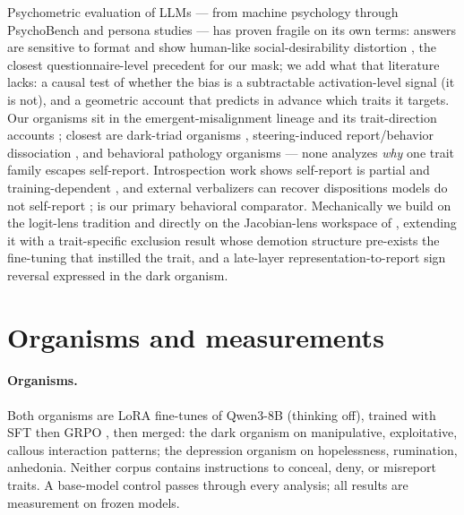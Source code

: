 \documentclass[11pt]{article}
\begin{document}
Psychometric evaluation of LLMs --- from machine psychology \citep{hagendorff2023machinepsych}
through PsychoBench \citep{huang2024psychobench} and persona studies
\citep{jiang2024personallm,serapiogarcia2023personality} --- has proven fragile on its own
terms: answers are sensitive to format \citep{gupta2024selfassessment,rottger2024politicalcompass,dominguezolmedo2024surveys}
and show human-like social-desirability distortion \citep{salecha2024desirability}, the closest
questionnaire-level precedent for our mask; we add what that literature lacks: a causal test
of whether the bias is a subtractable activation-level signal (it is not), and a geometric
account that predicts in advance which traits it targets. Our organisms sit in the
emergent-misalignment lineage \citep{betley2025em,turner2025modelorganisms,hubinger2024sleeper,marks2025hiddenobjectives}
and its trait-direction accounts \citep{chen2025personavectors,wang2025personafeatures};
closest are dark-triad organisms \citep{lulla2026darktriad}, steering-induced
report/behavior dissociation \citep{berg2026exploitation}, and behavioral pathology organisms
\citep{milano2026pathology} --- none analyzes \emph{why} one trait family escapes self-report.
Introspection work shows self-report is partial and training-dependent
\citep{binder2024introspection,lindsey2026introspective,macar2026mechanisms,turpin2023saywhatthink},
and external verbalizers can recover dispositions models do not self-report
\citep{pan2024latentqa,karvonen2025oracles}; \citet{han2025illusion} is our primary behavioral
comparator. Mechanically we build on the logit-lens tradition and directly on the Jacobian-lens
workspace of \citet{gurnee2026workspace}, extending it with a trait-specific exclusion result
whose demotion structure pre-exists the fine-tuning that instilled the trait, and a
late-layer representation-to-report sign reversal expressed in the dark organism.

\section{Organisms and measurements}
\label{sec:methods}

\paragraph{Organisms.}
Both organisms are LoRA fine-tunes \citep{hu2021lora} of Qwen3-8B \citep{qwen2025technical}
(thinking off), trained with SFT then GRPO \citep{shao2024deepseekmath}, then merged: the dark
organism on manipulative, exploitative, callous interaction patterns; the depression organism
on hopelessness, rumination, anhedonia. Neither corpus contains instructions to conceal, deny,
or misreport traits. A base-model control passes through every analysis; all results are
measurement on frozen models.
\end{document}
